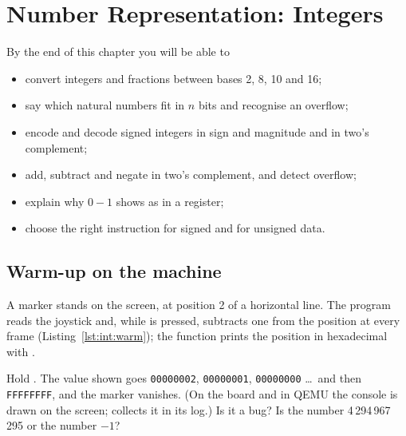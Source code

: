 \chapter{Number Representation: Integers}
\label{ch:integers}


\begin{chapgoals}
By the end of this chapter you will be able to
\begin{itemize}
\item convert integers and fractions between bases 2, 8, 10 and 16;
\item say which natural numbers fit in $n$ bits and recognise an overflow;
\item encode and decode signed integers in sign and magnitude and in two's complement;
\item add, subtract and negate in two's complement, and detect overflow;
\item explain why $0-1$ shows as  in a \riscv register;
\item choose the right \riscv instruction for signed and for unsigned data.
\end{itemize}
\end{chapgoals}


\section{Warm-up on the machine}

A marker stands on the screen, at position 2 of a horizontal line. The
program reads the joystick and, while  is pressed, subtracts one
from the position at every frame (Listing~\ref{lst:int:warm}); the function
 prints the position in hexadecimal with
.


\begin{prgtry}
Hold . The value shown goes \texttt{00000002}, \texttt{00000001},
\texttt{00000000} \ldots\ and then \texttt{FFFFFFFF}, and the marker vanishes.
(On the board and in QEMU the console is drawn on the screen; \prgqt collects
it in its log.) Is it a bug? Is  the number 4\,294\,967\,295
or the number $-1$?
\end{prgtry}

